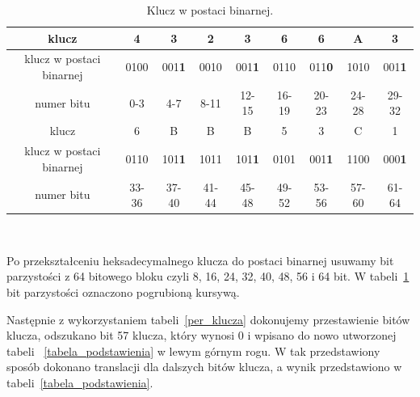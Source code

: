 \documentclass[12p]{article}
\begin{document}
\begin{table}[H]
\centering
\begin{tabular}{|c|c|c|c|c|c|c|c|c|}
\hline
klucz & 4 & 3 & 2 & 3 & 6 & 6 & A & 3\\
\hline
klucz w postaci binarnej & 0100 & 001\textbf{1} & 0010 & 001\textbf{1} & 0110 & 011\textbf{0} & 1010 & 001\textbf{1}\\ 
\hline
numer bitu & 0-3 & 4-7 & 8-11 & 12-15 & 16-19 & 20-23 & 24-28 & 29-32\\
\hline
\hline
klucz & 6 & B & B & B & 5 & 3 & C & 1\\
\hline
klucz w postaci binarnej & 0110 & 101\textbf{1} & 1011 & 101\textbf{1} & 0101 & 001\textbf{1} & 1100 & 000\textbf{1}\\
\hline
numer bitu & 33-36 & 37-40 & 41-44 & 45-48 & 49-52 & 53-56 & 57-60 & 61-64\\
\hline
\end{tabular}
\caption{Klucz w postaci binarnej.}~\label{klucz_to_binary}
\end{table}

Po przekształceniu heksadecymalnego klucza do postaci binarnej usuwamy bit parzystości z 64 bitowego bloku czyli 8, 16, 24, 32, 40, 48, 56 i 64 bit. W tabeli~\ref{klucz_to_binary} bit parzystości oznaczono pogrubioną kursywą.

Następnie z wykorzystaniem tabeli~\ref{per_klucza} dokonujemy przestawienie bitów klucza, odszukano bit 57 klucza, który wynosi 0 i wpisano do nowo utworzonej tabeli ~\ref{tabela_podstawienia} w lewym górnym rogu. W tak przedstawiony sposób dokonano translacji dla dalszych bitów klucza, a wynik przedstawiono w tabeli~\ref{tabela_podstawienia}.
\end{document}
